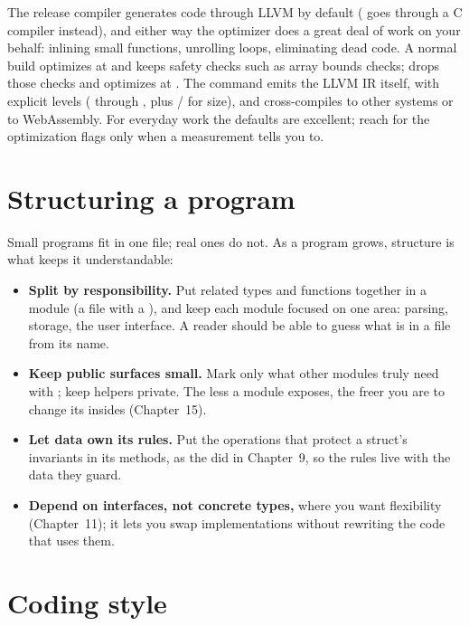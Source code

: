 \begin{deep}
The release compiler generates code through LLVM by default (
goes through a C compiler instead), and either way the optimizer does a great
deal of work on your behalf: inlining small functions, unrolling loops,
eliminating dead code. A normal build optimizes at  and keeps safety
checks such as array bounds checks;  drops those
checks and optimizes at . The  command emits the
LLVM IR itself, with explicit levels ( through , plus
/ for size), and  cross-compiles to other
systems or to WebAssembly. For everyday work the defaults are excellent; reach
for the optimization flags only when a measurement tells you to.
\end{deep}

\section{Structuring a program}

Small programs fit in one file; real ones do not. As a program grows, structure is
what keeps it understandable:

\begin{itemize}[leftmargin=1.4em]
  \item \textbf{Split by responsibility.} Put related types and functions together
        in a module (a file with a ), and keep each module focused on
        one area: parsing, storage, the user interface. A reader should be able
        to guess what is in a file from its name.
  \item \textbf{Keep public surfaces small.} Mark only what other modules truly
        need with ; keep helpers private. The less a module exposes, the
        freer you are to change its insides (Chapter~15).
  \item \textbf{Let data own its rules.} Put the operations that protect a struct's
        invariants in its methods, as the  did in Chapter~9, so the
        rules live with the data they guard.
  \item \textbf{Depend on interfaces, not concrete types,} where you want
        flexibility (Chapter~11); it lets you swap implementations without
        rewriting the code that uses them.
\end{itemize}

\section{Coding style}


